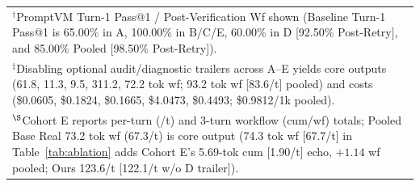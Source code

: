 \documentclass[conference,10pt]{IEEEtran}
\begin{document}
\begin{table}[t]
{\begin{tabular}{lcccccccccc}
\bottomrule
\multicolumn{11}{l}{\scriptsize $^\dagger$PromptVM Turn-1 Pass@1 / Post-Verification Wf shown (Baseline Turn-1 Pass@1 is 65.00\% in A, 100.00\% in B/C/E, 60.00\% in D [92.50\% Post-Retry], and 85.00\% Pooled [98.50\% Post-Retry]).} \\
\multicolumn{11}{l}{\scriptsize $^\ddagger$Disabling optional audit/diagnostic trailers across A--E yields core outputs (61.8, 11.3, 9.5, 311.2, 72.2 tok wf; 93.2 tok wf [83.6/t] pooled) and costs (\$0.0605, \$0.1824, \$0.1665, \$4.0473, \$0.4493; \$0.9812/1k pooled).} \\
\multicolumn{11}{l}{\scriptsize $^\S$Cohort E reports per-turn (/t) and 3-turn workflow (cum/wf) totals; Pooled Base Real 73.2 tok wf (67.3/t) is core output (74.3 tok wf [67.7/t] in Table~\ref{tab:ablation} adds Cohort E's 5.69-tok cum [1.90/t] echo, $+1.14$ wf pooled; Ours 123.6/t [122.1/t w/o D trailer]).}
\end{tabular}%
}
\end{table}
\end{document}
